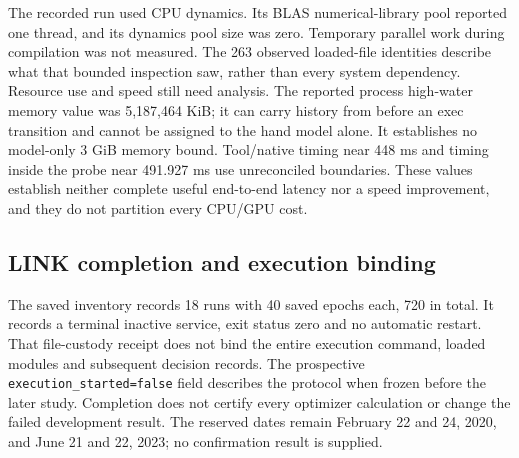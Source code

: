 The recorded run used CPU dynamics. Its BLAS numerical-library pool reported one thread, and its dynamics pool size was zero. Temporary parallel work during compilation was not measured. The 263 observed loaded-file identities describe what that bounded inspection saw, rather than every system dependency. Resource use and speed still need analysis. The reported process high-water memory value was 5,187,464 KiB; it can carry history from before an exec transition and cannot be assigned to the hand model alone. It establishes no model-only 3 GiB memory bound. Tool/native timing near 448 ms and timing inside the probe near 491.927 ms use unreconciled boundaries. These values establish neither complete useful end-to-end latency nor a speed improvement, and they do not partition every CPU/GPU cost.

\subsection{LINK completion and execution binding}
The saved inventory records 18 runs with 40 saved epochs each, 720 in total. It records a terminal inactive service, exit status zero and no automatic restart. That file-custody receipt does not bind the entire execution command, loaded modules and subsequent decision records. The prospective \texttt{execution\_started=false} field describes the protocol when frozen before the later study. Completion does not certify every optimizer calculation or change the failed development result. The reserved dates remain February 22 and 24, 2020, and June 21 and 22, 2023; no confirmation result is supplied.

